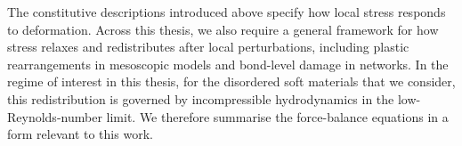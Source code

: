 The constitutive descriptions introduced above specify how local stress responds to deformation. Across this thesis, we also require a general framework for how stress relaxes and redistributes after local perturbations, including plastic rearrangements in mesoscopic models and bond-level damage in networks. In the regime of interest in this thesis, for the disordered soft materials that we consider, this redistribution is governed by incompressible hydrodynamics in the low-Reynolds-number limit. We therefore summarise the force-balance equations in a form relevant to this work.




